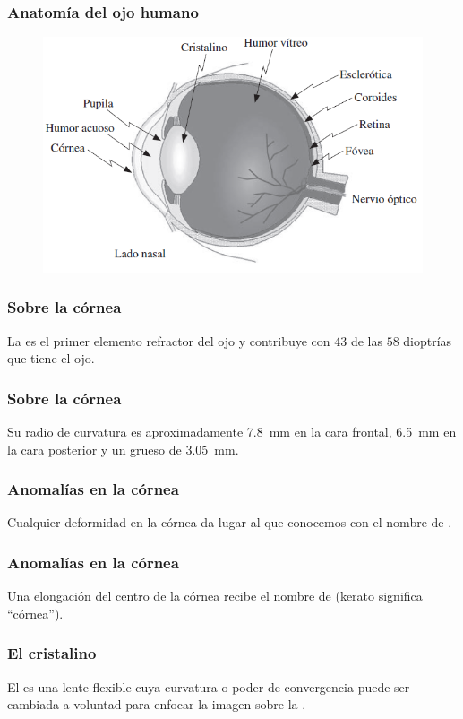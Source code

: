 \documentclass[14pt]{beamer}
\begin{document}
\begin{frame}
\frametitle{Anatomía del ojo humano}
\begin{figure}
    \centering
    \includegraphics[scale=0.5]{Imagenes/Anatomia_Ojo_Humano.png}
\end{figure}
\end{frame}
\begin{frame}
\frametitle{Sobre la córnea}
La  es el primer elemento refractor del ojo \pause y contribuye con $43$ de las $58$ dioptrías que tiene el ojo.
\end{frame}
\begin{frame}
\frametitle{Sobre la córnea}
Su radio de curvatura es aproximadamente \SI{7.8}{\milli\meter} en la cara frontal, \pause \SI{6.5}{\milli\meter} en la cara posterior y un grueso de \SI{3.05}{\milli\meter}.
\end{frame}
\begin{frame}
\frametitle{Anomalías en la córnea}
Cualquier deformidad en la córnea da lugar al  que conocemos
con el nombre de \pause {}.
\end{frame}
\begin{frame}
\frametitle{Anomalías en la córnea}
Una elongación del centro de la córnea recibe el nombre de  \pause (kerato significa \enquote{córnea}).
\end{frame}
\begin{frame}
\frametitle{El cristalino}
El  es una lente flexible \pause cuya curvatura o poder de convergencia puede ser cambiada a voluntad para enfocar la imagen sobre la .
\end{frame}
\end{document}
